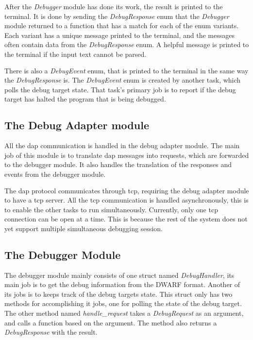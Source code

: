 After the \emph{Debugger} module has done its work, the result is printed to the terminal.
It is done by sending the \emph{DebugResponse} enum that the \emph{Debugger} module returned to a function that has a match for each of the enum variants.
Each variant has a unique message printed to the terminal, and the messages often contain data from the \emph{DebugResponse} enum.
A helpful message is printed to the terminal if the input text cannot be parsed.


There is also a \emph{DebugEvent} enum, that is printed to the terminal in the same way the \emph{DebugResponse} is.
The \emph{DebugEvent} enum is created by another task, which polls the debug target state.
That task's primary job is to report if the debug target has halted the program that is being debugged.



\subsection{The Debug Adapter module}

All the \gls{dap} communication is handled in the debug adapter module.
The main job of this module is to translate \gls{dap} messages into requests, which are forwarded to the debugger module.
It also handles the translation of the responses and events from the debugger module.


The \gls{dap} protocol communicates through \gls{tcp}, requiring the debug adapter module to have a \gls{tcp} server.
All the \gls{tcp} communication is handled asynchronously, this is to enable the other tasks to run simultaneously.
Currently, only one \gls{tcp} connection can be open at a time.
This is because the rest of the system does not yet support multiple simultaneous debugging session.



\subsection{The Debugger Module}
The debugger module mainly consists of one struct named \emph{DebugHandler}, its main job is to get the debug information from the \gls{DWARF} format.
Another of its jobs is to keeps track of the debug targets state.
This struct only has two methods for accomplishing it jobs, one for polling the state of the debug target.
The other method named \emph{handle\_request} takes a \emph{DebugRequest} as an argument, and calls a function based on the argument.
The method also returns a \emph{DebugResponse} with the result.


